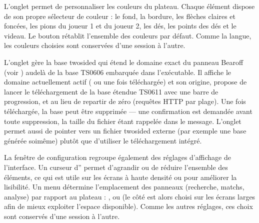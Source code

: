 \documentclass[letterpaper,10pt,french]{sphinxmanual}
\begin{document}
\sphinxAtStartPar
L’onglet  permet de personnaliser les couleurs du
plateau. Chaque élément dispose de son propre sélecteur de couleur : le fond,
la bordure, les flèches claires et foncées, les pions du joueur 1 et du joueur
2, les dés, les points des dés et le videau. Le bouton  rétablit
l’ensemble des couleurs par défaut. Comme la langue, les couleurs choisies sont
conservées d’une session à l’autre.

\sphinxAtStartPar
L’onglet  gère la base two\sphinxhyphen{}sided qui étend le domaine exact du
panneau Bearoff (voir {\hyperref[\detokenize{manuel:panneau-epc}]{}}) au\sphinxhyphen{}delà de la base TS\sphinxhyphen{}06\sphinxhyphen{}06
embarquée dans l’exécutable. Il affiche le domaine actuellement actif
( ou  une fois téléchargée) et son origine, propose de
lancer le téléchargement de la base étendue TS\sphinxhyphen{}06\sphinxhyphen{}11 avec une barre de
progression, et  au
lieu de repartir de zéro (requêtes HTTP par plage). Une fois téléchargée, la
base peut être supprimée — une confirmation est demandée avant toute
suppression, la taille du fichier étant rappelée dans le message. L’onglet
permet aussi de pointer vers un fichier  two\sphinxhyphen{}sided externe (par exemple
une base générée soi\sphinxhyphen{}même) plutôt que d’utiliser le téléchargement intégré.

\sphinxAtStartPar
La fenêtre de configuration regroupe également des réglages d’affichage de
l’interface. Un curseur d” permet d’agrandir ou de
réduire l’ensemble des éléments, ce qui est utile sur les écrans à haute
densité ou pour améliorer la lisibilité. Un menu 
détermine l’emplacement des panneaux (recherche, matchs, analyse) par rapport
au plateau : ,  ou  (le côté est alors choisi
sur les écrans larges afin de mieux exploiter l’espace disponible). Comme les
autres réglages, ces choix sont conservés d’une session à l’autre.
\end{document}
